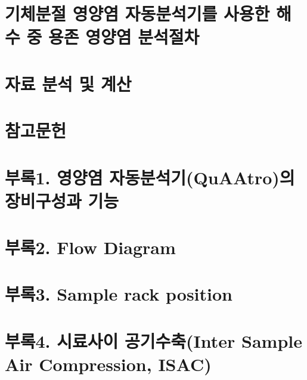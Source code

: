 \documentclass[
]{book}
\begin{document}
\hypertarget{uxae30uxccb4uxbd84uxc808-uxc601uxc591uxc5fc-uxc790uxb3d9uxbd84uxc11duxae30uxb97c-uxc0acuxc6a9uxd55c-uxd574uxc218-uxc911-uxc6a9uxc874-uxc601uxc591uxc5fc-uxbd84uxc11duxc808uxcc28-1}{%
\section{기체분절 영양염 자동분석기를 사용한 해수 중 용존 영양염 분석절차}\label{uxae30uxccb4uxbd84uxc808-uxc601uxc591uxc5fc-uxc790uxb3d9uxbd84uxc11duxae30uxb97c-uxc0acuxc6a9uxd55c-uxd574uxc218-uxc911-uxc6a9uxc874-uxc601uxc591uxc5fc-uxbd84uxc11duxc808uxcc28-1}}

\hypertarget{uxc790uxb8cc-uxbd84uxc11d-uxbc0f-uxacc4uxc0b0-1}{%
\section{자료 분석 및 계산}\label{uxc790uxb8cc-uxbd84uxc11d-uxbc0f-uxacc4uxc0b0-1}}

\hypertarget{uxcc38uxace0uxbb38uxd5cc-2}{%
\section{참고문헌}\label{uxcc38uxace0uxbb38uxd5cc-2}}

\hypertarget{uxbd80uxb85d1.-uxc601uxc591uxc5fc-uxc790uxb3d9uxbd84uxc11duxae30quaatrouxc758-uxc7a5uxbe44uxad6cuxc131uxacfc-uxae30uxb2a5}{%
\section{부록1. 영양염 자동분석기(QuAAtro)의 장비구성과 기능}\label{uxbd80uxb85d1.-uxc601uxc591uxc5fc-uxc790uxb3d9uxbd84uxc11duxae30quaatrouxc758-uxc7a5uxbe44uxad6cuxc131uxacfc-uxae30uxb2a5}}

\hypertarget{uxbd80uxb85d2.-flow-diagram}{%
\section{부록2. Flow Diagram}\label{uxbd80uxb85d2.-flow-diagram}}

\hypertarget{uxbd80uxb85d3.-sample-rack-position}{%
\section{부록3. Sample rack position}\label{uxbd80uxb85d3.-sample-rack-position}}

\hypertarget{uxbd80uxb85d4.-uxc2dcuxb8ccuxc0acuxc774-uxacf5uxae30uxc218uxcd95inter-sample-air-compression-isac}{%
\section{부록4. 시료사이 공기수축(Inter Sample Air Compression, ISAC)}\label{uxbd80uxb85d4.-uxc2dcuxb8ccuxc0acuxc774-uxacf5uxae30uxc218uxcd95inter-sample-air-compression-isac}}
\end{document}
